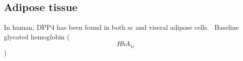 \subsection{Adipose tissue}
In human, DPP4 has been found in both sc and viseral adipose cells.~\cite{Lamers2011} Baseline glycated hemoglobin (\[ HbA_{1c} \]) 
